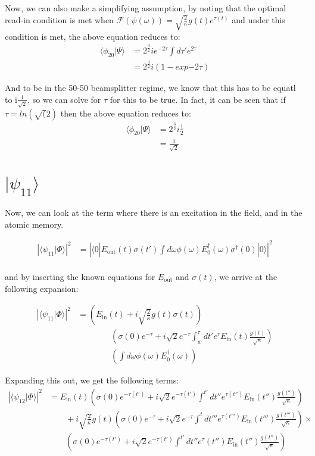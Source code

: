\documentclass[12pt]{article}
\begin{document}
Now, we can also make a simplifying assumption, by noting that the optimal read-in condition is met when $\mathscr{F}(\psi(\omega)) = \sqrt{\frac{2}{\kappa}} g(t) e^{\tau(t)}$ and under this condition is met, the above equation reduces to:
\begin{align}
\langle \phi_{20}| \Psi \rangle & = 2^{\frac{3}{2}} i e^{-2\tau} \int d \tau' e^{2 \tau} \\
& = 2^{\frac{3}{2}} i\left(1- exp{-2\tau}\right)
\end{align}

And to be in the 50-50 beamsplitter regime, we know that this has to be equatl to i$\frac{1}{\sqrt{2}}$, so we can solve for $\tau$ for this to be true. In fact, it can be seen that if $\tau = ln(\sqrt(2)$ then the above equation reduces to:
\begin{align}
\langle \phi_{20}| \Psi \rangle &= 2^{\frac{3}{2}} i \frac{1}{2} \\
&= \frac{1}{\sqrt{2}}
\end{align}

\section{$| \psi_{11} \rangle$}
Now, we can look at the term where there is an excitation in the field, and in the atomic memory.

\begin{align}
\left | \langle \psi_{11} | \Phi \rangle \right | ^2 &= \left | \langle 0 | E_\textrm{out}(t) \sigma(t') \int d \omega \phi(\omega)E^\dagger_0(\omega)
\sigma^\dagger(0) | 0 \rangle \right |^2 \\
\end{align}

and by inserting the known equations for $E_\textrm{out}$ and $\sigma(t)$, we arrive at the following expansion:

\begin{align}
\left | \langle \psi_{11} | \Phi \rangle \right | ^2 &= 
   \left(  E_\textrm{in}(t) + i \sqrt{\frac{2}{\kappa}} g(t) \sigma(t) \right )\\
   & \qquad \qquad \left (\sigma(0) e^{-\tau} + i\sqrt{2} e^{-\tau} \int^\tau_w d t' e^\tau E_\textrm{in}(t) \frac{g(t)}{\sqrt{\kappa}}\right)\\
   &\qquad \qquad \left(\int d \omega \phi(\omega)E^\dagger_0(\omega) \right )
\end{align}

Expanding this out, we get the following terms:
\begin{align}
\left | \langle \psi_{12} | \Phi \rangle \right | ^2 &= 
E_\textrm{in}(t) \left( \sigma(0) e^{-\tau(t')} + i\sqrt{2} e^{-\tau(t')} \int^{t'} d t'' e^{\tau(t'')} E_\textrm{in}(t'') \frac{g(t'')}{\sqrt{\kappa}} \right ) \\
&\qquad+ i \sqrt{\frac{2}{\kappa}}g(t)\left (\sigma(0) e^{-\tau} + i\sqrt{2} e^{-\tau} \int^{t}d t''' e^{\tau(t''')} E_\textrm{in}(t''') \frac{g(t''')}{\sqrt{\kappa}} \right) \times\\
&\qquad \left(\sigma(0) e^{-\tau(t')} + i\sqrt{2} e^{-\tau(t')} \int^{t'} d t'' e^\tau(t'') E_\textrm{in}(t'') \frac{g(t'')}{\sqrt{\kappa}}\right) 
\end{align}
\end{document}
